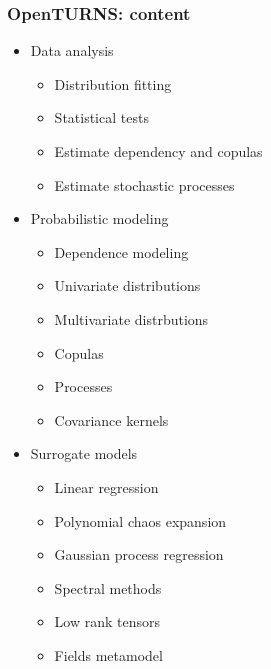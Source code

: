 \documentclass{beamer}
\begin{document}
\begin{frame}[containsverbatim]
  \frametitle{OpenTURNS: content}
  
  \begin{scriptsize}
  
  \begin{minipage}[t]{0.33\textwidth}
  \begin{itemize}
  \item Data analysis
  \begin{itemize}
  \tiny
  \item Distribution fitting
  \item Statistical tests
  \item Estimate dependency and copulas
  \item Estimate stochastic processes
  \end{itemize}
  \end{itemize}
  \end{minipage}%
  \begin{minipage}[t]{0.33\textwidth}
  \begin{itemize}
  \item Probabilistic modeling
  \begin{itemize}
  \tiny
  \item Dependence modeling
  \item Univariate distributions
  \item Multivariate distrbutions
  \item Copulas
  \item Processes 
  \item Covariance kernels
  \end{itemize}
  \end{itemize}
  \end{minipage}%
  \begin{minipage}[t]{0.33\textwidth}
  \begin{itemize}
  \item Surrogate models
  \begin{itemize}
  \tiny
  \item Linear regression
  \item Polynomial chaos expansion
  \item Gaussian  process regression
  \item Spectral methods
  \item Low rank tensors
  \item Fields metamodel
  \end{itemize}
  \end{itemize}
  \end{minipage}
  

\end{scriptsize}
\end{frame}
\end{document}
